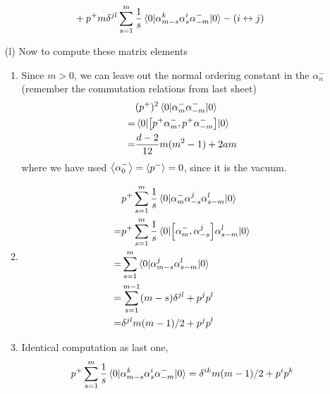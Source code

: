 \begin{enumerate}[label=(\alph*)]
\begin{align}
\begin{split}
																			 &+ p^+ m \delta^{jl} \sum_{s=1}^{m} \frac{1}{s} \braket{0 | \alpha^k_{m-s} \alpha^i_s \alpha^-_{-m} |0 } - (i \leftrightarrow j)
			\end{split}
		\end{align}
	\item[(l)] Now to compute these matrix elements
		\begin{enumerate}[label=(\roman*)]
			\item Since $m>0$, we can leave out the normal ordering constant in the $\alpha^-_n$ (remember the commutation relations from last sheet)
				\begin{align*}
					&(p^+)^2 \braket{0 | \alpha^-_{m} \alpha^-_{-m} | 0} \\
					=& \braket{0| \comm{p^+ \alpha^-_m}{p^+ \alpha^-_{-m}}|0} \\
					=&  \frac{d-2}{12} m (m^2 -1 ) + 2am
				\end{align*}
				where we have used $\expval{\alpha_0^-} = \expval{p^-} = 0$, since it is the vacuum.

			\item 
				\begin{align*}
					& p^+ \sum_{s=1}^m \frac{1}{s} \braket{0 | \alpha^-_m \alpha^j_{-s} \alpha^l_{s-m} | 0} \\
					=& p^+ \sum_{s=1}^m \frac{1}{s} \braket{0 | \comm{\alpha^-_m}{\alpha^j_{-s}} \alpha^l_{s-m} | 0} \\
					=& \sum_{s=1}^m \braket{0 | \alpha^j_{m-s} \alpha^l_{s-m} | 0 } \\
					=& \sum_{s=1}^{m-1} (m-s) \delta^{jl} + p^jp^l \\
					=& \delta^{jl} m(m-1)/2 + p^jp^l
				\end{align*}

			\item Identical computation as last one,
				\begin{equation}
					p^+ \sum_{s=1}^m \frac{1}{s} \braket{0 | \alpha^k_{m-s} \alpha^i_{s} \alpha^-_{-m} | 0} = \delta^{ik} m(m-1)/2 + p^i p^k
				\end{equation}


\end{enumerate}
\end{enumerate}
